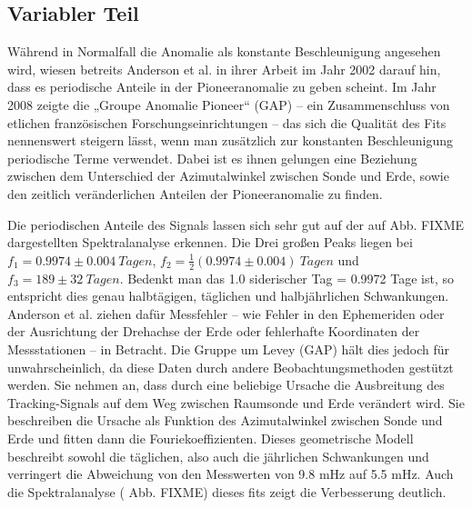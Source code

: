 
\subsection{Variabler Teil}
Während in Normalfall die Anomalie als konstante Beschleunigung angesehen wird, wiesen betreits Anderson et al. in
ihrer Arbeit im Jahr 2002 darauf hin, dass es periodische Anteile in der Pioneeranomalie zu geben scheint. Im Jahr 2008
zeigte die „Groupe Anomalie Pioneer“ (GAP) – ein Zusammenschluss von etlichen französischen Forschungseinrichtungen –
das sich die Qualität des Fits nennenswert steigern lässt, wenn man zusätzlich zur konstanten Beschleunigung
periodische Terme verwendet.
Dabei ist es ihnen gelungen eine Beziehung zwischen dem Unterschied der Azimutalwinkel zwischen Sonde und Erde, sowie
den zeitlich veränderlichen Anteilen der Pioneeranomalie zu finden. %

Die periodischen Anteile des Signals lassen sich sehr gut auf der auf Abb. FIXME dargestellten Spektralanalyse
erkennen. Die Drei großen Peaks liegen bei $f_1=0.9974\pm0.004\ Tagen$, $f_2=\frac12(0.9974\pm0.004)\ Tagen$ und 
$f_3=189\pm32\ Tagen$. Bedenkt man das 1.0 siderischer Tag = 0.9972 Tage ist, so entspricht dies genau
halbtägigen, täglichen und halbjährlichen Schwankungen. Anderson et al. ziehen dafür Messfehler – wie Fehler in den
Ephemeriden oder der Ausrichtung der Drehachse der Erde oder fehlerhafte Koordinaten der Messstationen – in Betracht.
Die Gruppe um Levey (GAP) hält dies jedoch für unwahrscheinlich, da diese Daten durch andere Beobachtungsmethoden
gestützt werden.
Sie nehmen an, dass durch eine beliebige Ursache die Ausbreitung des Tracking-Signals auf dem Weg zwischen Raumsonde und
Erde verändert wird. Sie beschreiben die Ursache als Funktion des Azimutalwinkel zwischen Sonde und Erde und fitten
dann die Fouriekoeffizienten. Dieses geometrische Modell beschreibt sowohl die täglichen, also auch die jährlichen
Schwankungen und verringert die Abweichung von den Messwerten von 9.8 mHz auf 5.5 mHz. Auch die Spektralanalyse (
Abb. FIXME) dieses fits zeigt die Verbesserung deutlich.